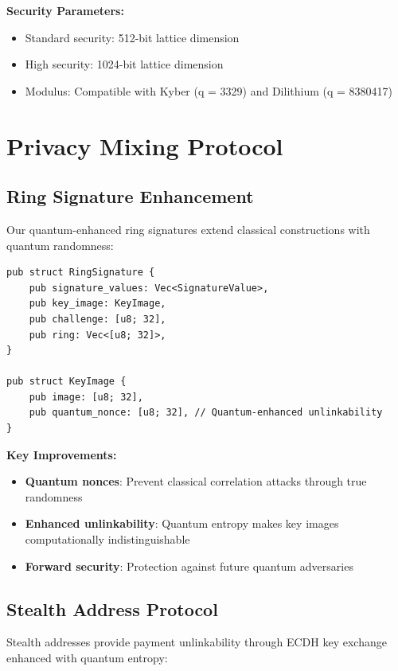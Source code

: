 \documentclass[12pt,a4paper]{article}
\begin{document}
\textbf{Security Parameters:}
\begin{itemize}
\item Standard security: 512-bit lattice dimension
\item High security: 1024-bit lattice dimension
\item Modulus: Compatible with Kyber (q = 3329) and Dilithium (q = 8380417)
\end{itemize}

\section{Privacy Mixing Protocol}

\subsection{Ring Signature Enhancement}

Our quantum-enhanced ring signatures extend classical constructions with quantum randomness:

\begin{lstlisting}[style=rustcode, caption=Quantum-Enhanced Ring Signature]
pub struct RingSignature {
    pub signature_values: Vec<SignatureValue>,
    pub key_image: KeyImage,
    pub challenge: [u8; 32],
    pub ring: Vec<[u8; 32]>,
}

pub struct KeyImage {
    pub image: [u8; 32],
    pub quantum_nonce: [u8; 32], // Quantum-enhanced unlinkability
}
\end{lstlisting}

\textbf{Key Improvements:}
\begin{itemize}
\item \textbf{Quantum nonces}: Prevent classical correlation attacks through true randomness
\item \textbf{Enhanced unlinkability}: Quantum entropy makes key images computationally indistinguishable
\item \textbf{Forward security}: Protection against future quantum adversaries
\end{itemize}

\subsection{Stealth Address Protocol}

Stealth addresses provide payment unlinkability through ECDH key exchange enhanced with quantum entropy:
\end{document}
